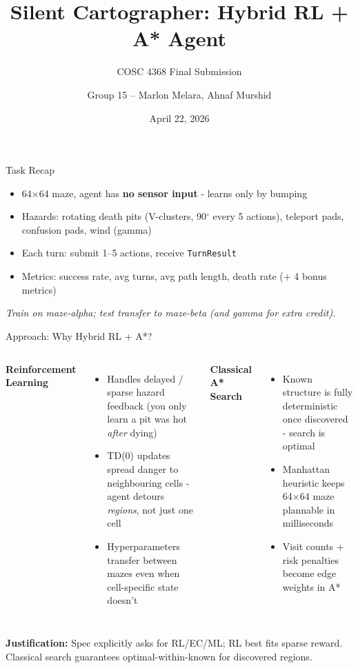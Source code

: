 \documentclass[aspectratio=169]{beamer}
\title{Silent Cartographer: Hybrid RL + A* Agent}
\subtitle{COSC 4368 Final Submission}
\author{Group 15 -- Marlon Melara, Ahnaf Murshid}
\date{April 22, 2026}
\begin{document}
\frame{\titlepage}

\begin{frame}{Task Recap}

\begin{itemize}
\item 64$\times$64 maze, agent has \textbf{no sensor input} - learns only by bumping
\item Hazards: rotating death pits (V-clusters, 90$^{\circ}$ every 5 actions), teleport pads, confusion pads, wind (gamma)
\item Each turn: submit 1--5 actions, receive \texttt{TurnResult}
\item Metrics: success rate, avg turns, avg path length, death rate (+ 4 bonus metrics)
\end{itemize}

\vspace{0.3cm}
\centering
\emph{Train on maze-alpha; test transfer to maze-beta (and gamma for extra credit).}

\end{frame}

\begin{frame}{Approach: Why Hybrid RL + A*?}

\begin{columns}[T]

\textbf{Reinforcement Learning}

\begin{itemize}
\item Handles delayed / sparse hazard feedback (you only learn a pit was hot \emph{after} dying)
\item TD(0) updates spread danger to neighbouring cells - agent detours \emph{regions}, not just one cell
\item Hyperparameters transfer between mazes even when cell-specific state doesn't
\end{itemize}


\textbf{Classical A* Search}

\begin{itemize}
\item Known structure is fully deterministic once discovered - search is optimal
\item Manhattan heuristic keeps 64$\times$64 maze plannable in milliseconds
\item Visit counts + risk penalties become edge weights in A*
\end{itemize}

\end{columns}

\vspace{0.4cm}
\centering
\textbf{Justification:} Spec explicitly asks for RL/EC/ML; RL best fits sparse reward. Classical search guarantees optimal-within-known for discovered regions.

\end{frame}
\end{document}
